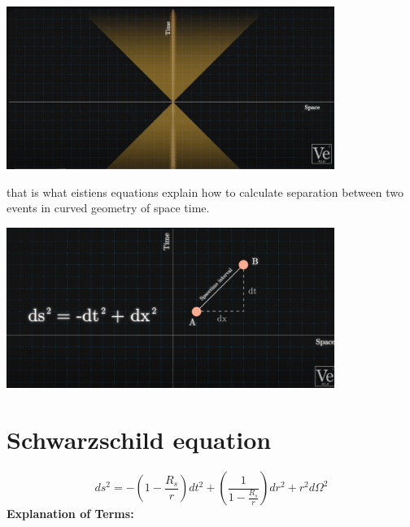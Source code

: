 \documentclass[12pt,a4paper]{article}
\begin{document}
\begin{center}
    \includegraphics[width=0.8\textwidth]{graph}\\
\end{center}

that is what eistiens equations explain how to calculate separation between two events in curved geometry of space time.
\begin{center}
    \includegraphics[width=0.8\textwidth]{graph2}\\
\end{center}

\section{ Schwarzschild equation}
\[
ds^2 = -\left(1 - \frac{R_s}{r}\right) dt^2 + \left(\frac{1}{1 - \frac{R_s}{r}}\right) dr^2 + r^2 d\Omega^2
\]
\textbf{Explanation of Terms:}
\end{document}
